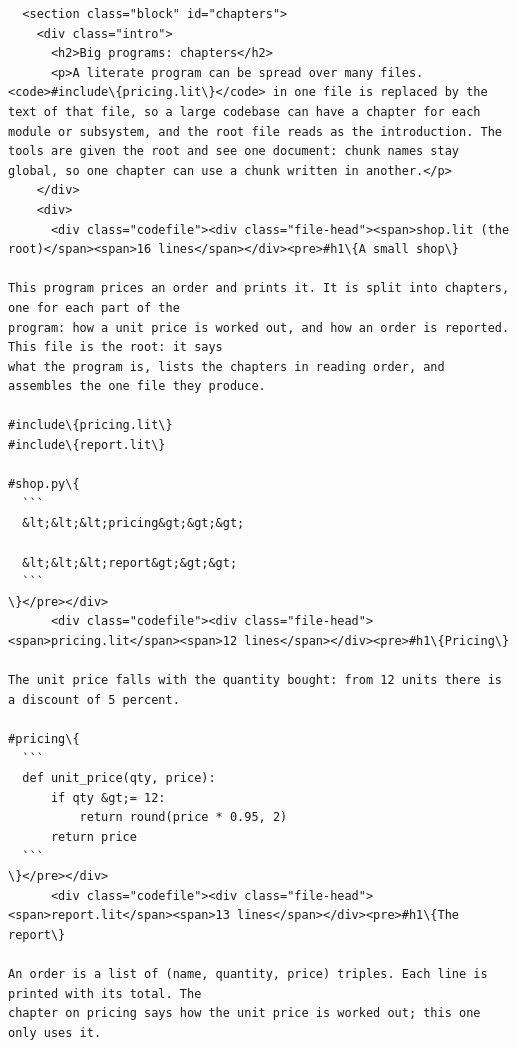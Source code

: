 \documentclass[10pt,a4paper]{article}
\newcounter{chunk}
\begin{document}
\begin{Verbatim}
  <section class="block" id="chapters">
    <div class="intro">
      <h2>Big programs: chapters</h2>
      <p>A literate program can be spread over many files. <code>#include\{pricing.lit\}</code> in one file is replaced by the text of that file, so a large codebase can have a chapter for each module or subsystem, and the root file reads as the introduction. The tools are given the root and see one document: chunk names stay global, so one chapter can use a chunk written in another.</p>
    </div>
    <div>
      <div class="codefile"><div class="file-head"><span>shop.lit (the root)</span><span>16 lines</span></div><pre>#h1\{A small shop\}

This program prices an order and prints it. It is split into chapters, one for each part of the
program: how a unit price is worked out, and how an order is reported. This file is the root: it says
what the program is, lists the chapters in reading order, and assembles the one file they produce.

#include\{pricing.lit\}
#include\{report.lit\}

#shop.py\{
  ```
  &lt;&lt;&lt;pricing&gt;&gt;&gt;

  &lt;&lt;&lt;report&gt;&gt;&gt;
  ```
\}</pre></div>
      <div class="codefile"><div class="file-head"><span>pricing.lit</span><span>12 lines</span></div><pre>#h1\{Pricing\}

The unit price falls with the quantity bought: from 12 units there is a discount of 5 percent.

#pricing\{
  ```
  def unit_price(qty, price):
      if qty &gt;= 12:
          return round(price * 0.95, 2)
      return price
  ```
\}</pre></div>
      <div class="codefile"><div class="file-head"><span>report.lit</span><span>13 lines</span></div><pre>#h1\{The report\}

An order is a list of (name, quantity, price) triples. Each line is printed with its total. The
chapter on pricing says how the unit price is worked out; this one only uses it.


\end{Verbatim}
\end{document}
